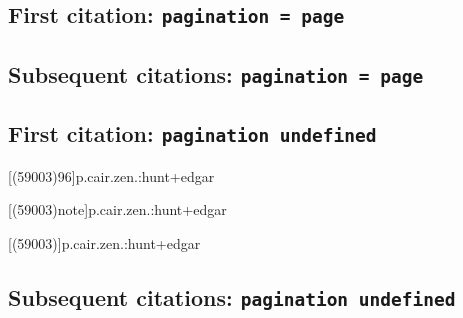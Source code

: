 \documentclass[a4paper]{article}
\begin{document}
\cite{ashurinscription}

\cite[(obv.\ lines 10)143]{ashurinscription}

\AtNextCite{\renewcommand*{\volcitedelim}{\addcomma\space}}
\cite[(obv.\ lines 10--17)note]{ashurinscription}

\subsection{First citation: \texttt{pagination = page}}

\cite{ashurinscription:a}

\citereset
\cite[(obv.\ lines 10)143]{ashurinscription:a}

\citereset
\cite[(obv.\ lines 10--17)note]{ashurinscription:a}

\subsection{Subsequent citations: \texttt{pagination = page}}

\cite{ashurinscription:a}

\cite[(obv.\ lines 10)143]{ashurinscription:a}

\cite[(obv.\ lines 10--17)note]{ashurinscription:a}

\subsection{First citation: \texttt{pagination undefined}}

\cite{p.cair.zen.:hunt+edgar}

\citereset
\cite[(59003)1:96]{p.cair.zen.:hunt+edgar}

\citereset
\cite[(59003)96]{p.cair.zen.:hunt+edgar}

\citereset
{}[(59003)96]{p.cair.zen.:hunt+edgar}

\citereset
\AtNextCite{\renewcommand*{\volcitedelim}{\addcomma\space}}
[(59003)note]{p.cair.zen.:hunt+edgar}

\citereset
{}[(59003)]{p.cair.zen.:hunt+edgar}

\citereset
\cite[(59003)note]{p.cair.zen.:hunt+edgar}

\subsection{Subsequent citations: \texttt{pagination undefined}}

\cite{p.cair.zen.:hunt+edgar}
\end{document}
